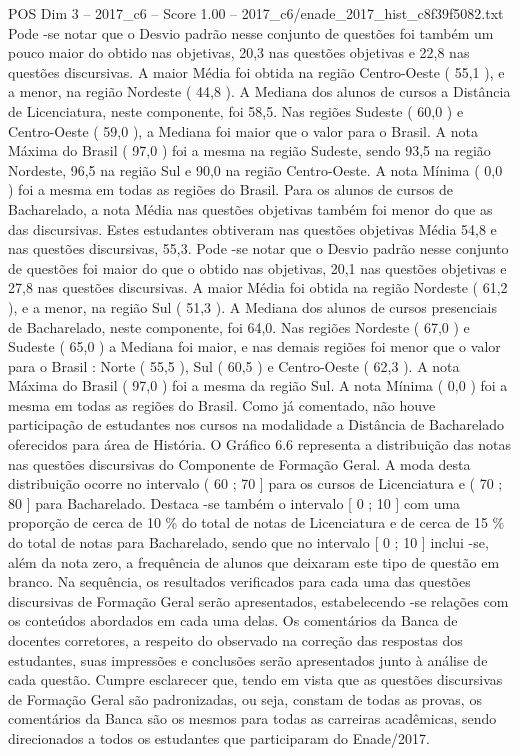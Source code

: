 \begin{textsample}{POS Dim 3 – 2017\_c6 – Score 1.00 – 2017\_c6/enade\_2017\_hist\_c8f39f5082.txt}
Pode -se notar que o Desvio padrão nesse conjunto de questões foi também um pouco maior do obtido nas objetivas, 20,3 nas questões objetivas e 22,8 nas questões discursivas.
A maior Média foi obtida na região Centro-Oeste ( 55,1 ), e a menor, na região Nordeste ( 44,8 ).
A Mediana dos alunos de cursos a Distância de Licenciatura, neste componente, foi 58,5.
Nas regiões Sudeste ( 60,0 ) e Centro-Oeste ( 59,0 ), a Mediana foi maior que o valor para o Brasil.
A nota Máxima do Brasil ( 97,0 ) foi a mesma na região Sudeste, sendo 93,5 na região Nordeste, 96,5 na região Sul e 90,0 na região Centro-Oeste.
A nota Mínima ( 0,0 ) foi a mesma em todas as regiões do Brasil.
Para os alunos de cursos de Bacharelado, a nota Média nas questões objetivas também foi menor do que as das discursivas.
Estes estudantes obtiveram nas questões objetivas Média 54,8 e nas questões discursivas, 55,3.
Pode -se notar que o Desvio padrão nesse conjunto de questões foi maior do que o obtido nas objetivas, 20,1 nas questões objetivas e 27,8 nas questões discursivas.
A maior Média foi obtida na região Nordeste ( 61,2 ), e a menor, na região Sul ( 51,3 ).
A Mediana dos alunos de cursos presenciais de Bacharelado, neste componente, foi 64,0.
Nas regiões Nordeste ( 67,0 ) e Sudeste ( 65,0 ) a Mediana foi maior, e nas demais regiões foi menor que o valor para o Brasil : Norte ( 55,5 ), Sul ( 60,5 ) e Centro-Oeste ( 62,3 ).
A nota Máxima do Brasil ( 97,0 ) foi a mesma da região Sul.
A nota Mínima ( 0,0 ) foi a mesma em todas as regiões do Brasil.
Como já comentado, não houve participação de estudantes nos cursos na modalidade a Distância de Bacharelado oferecidos para área de História.
O Gráfico 6.6 representa a distribuição das notas nas questões discursivas do Componente de Formação Geral.
A moda desta distribuição ocorre no intervalo ( 60 ; 70 ] para os cursos de Licenciatura e ( 70 ; 80 ] para Bacharelado.
Destaca -se também o intervalo [ 0 ; 10 ] com uma proporção de cerca de 10 \% do total de notas de Licenciatura e de cerca de 15 \% do total de notas para Bacharelado, sendo que no intervalo [ 0 ; 10 ] inclui -se, além da nota zero, a frequência de alunos que deixaram este tipo de questão em branco.
Na sequência, os resultados verificados para cada uma das questões discursivas de Formação Geral serão apresentados, estabelecendo -se relações com os conteúdos abordados em cada uma delas.
Os comentários da Banca de docentes corretores, a respeito do observado na correção das respostas dos estudantes, suas impressões e conclusões serão apresentados junto à análise de cada questão.
Cumpre esclarecer que, tendo em vista que as questões discursivas de Formação Geral são padronizadas, ou seja, constam de todas as provas, os comentários da Banca são os mesmos para todas as carreiras acadêmicas, sendo direcionados a todos os estudantes que participaram do Enade/2017.

\end{textsample}
